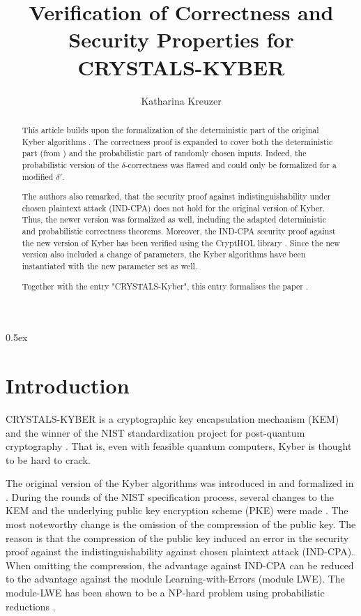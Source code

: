 \documentclass[11pt,a4paper]{article}
\begin{document}
\title{Verification of Correctness and Security Properties for CRYSTALS-KYBER}
\author{Katharina Kreuzer}
\maketitle

\begin{abstract}
This article builds upon the formalization of the deterministic part of the original Kyber algorithms \cite{Formalization}.
The correctness proof is expanded to cover both the deterministic part 
(from \cite{Formalization}) 
and the probabilistic part of randomly chosen inputs.
Indeed, the probabilistic version of the $\delta$-correctness \cite{kyber} was flawed and could only be formalized for a modified $\delta'$.

The authors \cite{kyber} also remarked, that the security proof against indistinguishability under chosen plaintext attack (IND-CPA) does not hold for the original version of Kyber.
Thus, the newer version \cite{KyberRound2,KyberRound3} was formalized as well, including the adapted deterministic and probabilistic correctness theorems.
Moreover, the IND-CPA security proof against the new version of Kyber has been verified using the CryptHOL library \cite{CryptHOLTutorial, CryptHOL-AFP}.
Since the new version also included a change of parameters, the Kyber algorithms have been instantiated with the new parameter set as well.

Together with the entry "CRYSTALS-Kyber"\cite{Formalization}, this entry formalises the paper \cite{PaperTBD}.
\end{abstract}


\newpage
\tableofcontents

\newpage
\parindent 0pt\parskip 0.5ex

\section{Introduction}
CRYSTALS-KYBER is a cryptographic key encapsulation mechanism (KEM) and the winner of the NIST standardization project for post-quantum cryptography \cite{report3rdroundNIST}. That is, even with feasible quantum computers, Kyber is thought to be hard to crack. 

The original version of the Kyber algorithms was introduced in \cite{kyber,KyberAS} and formalized in \cite{Formalization}. 
During the rounds of the NIST specification process, several changes to the KEM and the underlying public key encryption scheme (PKE) were made \cite{KyberRound2, KyberRound3}.
The most noteworthy change is the omission of the compression of the public key. The reason is that the compression of the public key induced an error in the security proof against the indistinguishability against chosen plaintext attack (IND-CPA).
When omitting the compression, the advantage against IND-CPA can be reduced to the advantage against the module Learning-with-Errors (module LWE).
The module-LWE has been shown to be a NP-hard problem using probabilistic reductions \cite{moduleLWE}. 
\end{document}
